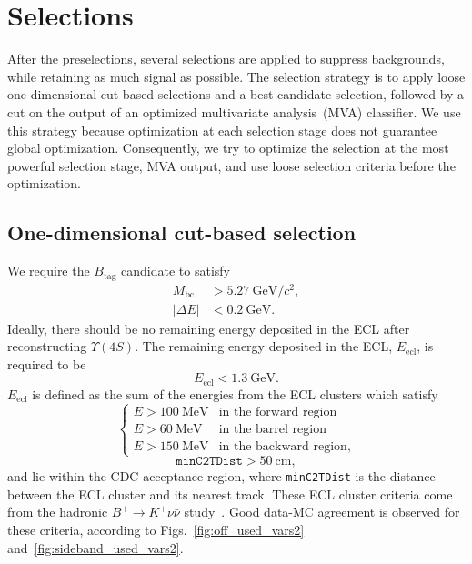 \section{Selections}
\label{sec:selection}
After the preselections, several selections are applied to suppress backgrounds, while retaining as much signal as possible.
The selection strategy is to apply loose one-dimensional cut-based selections and a best-candidate selection, followed by a cut on the output of an optimized multivariate analysis~(MVA) classifier.
We use this strategy because optimization at each selection stage does not guarantee global optimization.
Consequently, we try to optimize the selection at the most powerful selection stage, MVA output, and use loose selection criteria before the optimization.

\subsection{One-dimensional cut-based selection}
\label{sec:one_dimensional_cut}
We require the $B_{\textrm{tag}}$ candidate to satisfy
\begin{equation}
\begin{aligned}
  M_{\textrm{bc}} &> 5.27~\textrm{GeV}/c^{2},\\
  \left| \Delta E \right| &< 0.2~\textrm{GeV}.
\end{aligned}
\end{equation}
Ideally, there should be no remaining energy deposited in the ECL after reconstructing $\Upsilon(4S)$.
The remaining energy deposited in the ECL, $E_{\textrm{ecl}}$, is required to be
\begin{equation}
 E_{\textrm{ecl}} < 1.3~\textrm{GeV}.
\end{equation}
$E_{\textrm{ecl}}$ is defined as the sum of the energies from the ECL clusters which satisfy
\begin{equation}
\begin{cases}
E > 100~\textrm{MeV} &\text{in the forward region}\\
E > 60~\textrm{MeV} &\text{in the barrel region}\\
E > 150~\textrm{MeV} &\text{in the backward region},
\end{cases}
\end{equation}
\begin{equation}
 \texttt{minC2TDist} > 50~\textrm{cm},
\end{equation}
and lie within the CDC acceptance region, where \texttt{minC2TDist} is the distance between the ECL cluster and its nearest track.
These ECL cluster criteria come from the hadronic $B^{+} \rightarrow K^{+} \nu \bar{\nu}$ study~\cite{Belle-II:2023esi}.
Good data-MC agreement is observed for these criteria, according to Figs.~\ref{fig:off_used_vars2} and~\ref{fig:sideband_used_vars2}.

